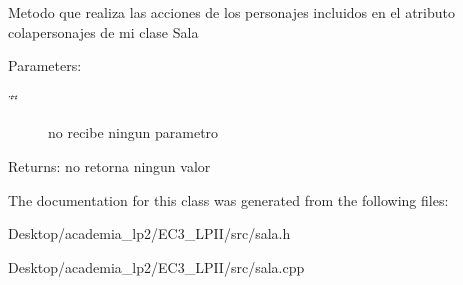 Metodo que realiza las acciones de los personajes incluidos en el atributo colapersonajes de mi clase Sala \begin{Desc}
\item[Parameters:]
\begin{description}
\item[{\em \char`\"{}\char`\"{}}]no recibe ningun parametro \end{description}
\end{Desc}
\begin{Desc}
\item[Returns:]no retorna ningun valor \end{Desc}


The documentation for this class was generated from the following files:\begin{CompactItemize}
\item 
Desktop/academia\_\-lp2/EC3\_\-LPII/src/sala.h\item 
Desktop/academia\_\-lp2/EC3\_\-LPII/src/sala.cpp\end{CompactItemize}
